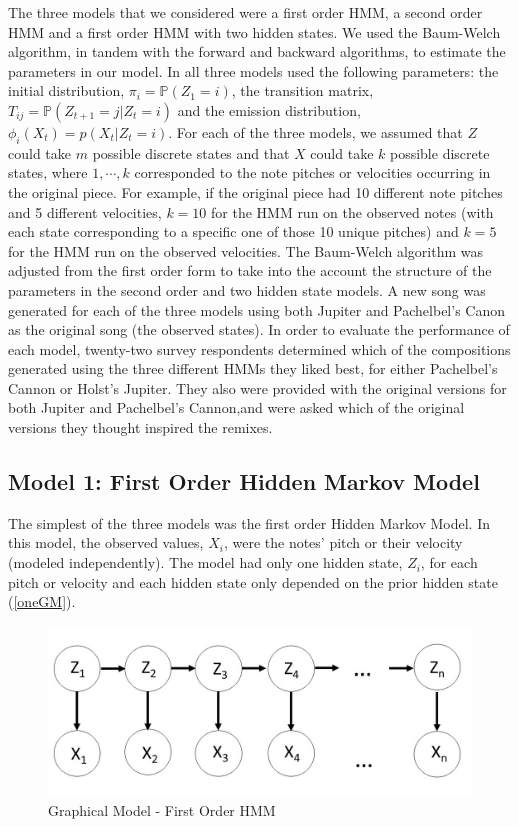\documentclass{article} %
\begin{document}
The three models that we considered were a first order HMM, a second order HMM and a first order HMM with two hidden states.  We used the Baum-Welch algorithm, in tandem with the forward and backward algorithms, to estimate the parameters in our model.  In all three models used the following parameters: the initial distribution, $\pi_i = \mathbb{P}(Z_1 = i)$, the transition matrix, $T_{ij} = \mathbb{P}(Z_{t+1} = j | Z_t = i)$ and the emission distribution, $\phi_i (X_t) = p(X_t | Z_t = i)$. For each of the three models, we assumed that $Z$ could take $m$ possible discrete states and that $X$ could take $k$  possible discrete states, where $1, \cdots, k$ corresponded to the note pitches or velocities occurring in the original piece.  For example, if the original piece had 10 different note pitches and 5 different velocities, $k=10$ for the HMM run on the observed notes (with each state corresponding to a specific one of those 10 unique pitches) and $k=5$ for the HMM run on the observed velocities.  The Baum-Welch algorithm was adjusted from the  first order form to take into the account the structure of the parameters in the second order and two hidden state models.   A new song was generated for each of the three models using both Jupiter and Pachelbel's Canon as the original song (the observed states).  In order to evaluate the performance of each model, twenty-two survey respondents determined which of the compositions generated using the three different HMMs they liked best, for either Pachelbel's Cannon or Holst's Jupiter. They also were provided with the original versions for both   Jupiter and Pachelbel's Cannon,and were asked which of the original versions they thought inspired the remixes. 

\subsection {Model 1: First Order Hidden Markov Model}

The simplest of the three models was the first order Hidden Markov Model. In this model, the observed values, $X_i$, were the notes' pitch or their velocity (modeled independently). The model had only one hidden state, $Z_i$, for each pitch or velocity  and each hidden state only depended on the prior hidden state (\autoref{oneGM}).

\begin{figure}[H]
\begin{center}


\includegraphics [scale = 0.35] {Model1.jpg}

\caption{Graphical Model - First Order HMM \label{oneGM}}
\end{center}
\end{figure}
\end{document}
